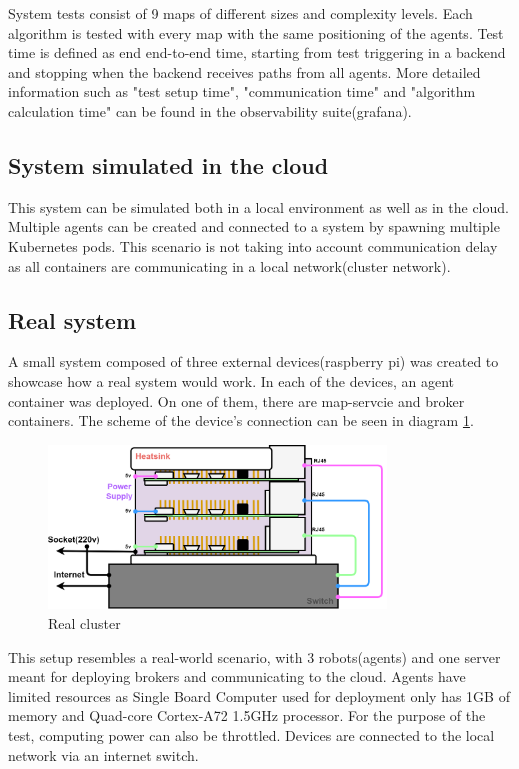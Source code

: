 System tests consist of 9 maps of different sizes and complexity levels. Each algorithm is tested with every map with the same positioning of the agents. Test time is defined as end end-to-end time, starting from test triggering in a backend and stopping when the backend receives paths from all agents. More detailed information such as "test setup time", "communication time" and "algorithm calculation time" can be found in the observability suite(grafana).

\subsection{System simulated in the cloud}
This system can be simulated both in a local environment as well as in the cloud. Multiple agents can be created and connected to a system by spawning multiple Kubernetes pods. This scenario is not taking into account communication delay as all containers are communicating in a local network(cluster network).

\subsection{Real system}
A small system composed of three external devices(raspberry pi) was created to showcase how a real system would work. In each of the devices, an agent container was deployed. On one of them, there are map-servcie and broker containers. The scheme of the device's connection can be seen in diagram \ref{fig:cluster}.
\begin{figure}[H]
    \centering
    \includegraphics[width=0.8\textwidth]{pictures/cluster.png}
    \caption{ Real cluster }
    \label{fig:cluster}
\end{figure}

This setup resembles a real-world scenario, with 3 robots(agents) and one server meant for deploying brokers and communicating to the cloud. Agents have limited resources as Single Board Computer used for deployment only has 1GB of memory and Quad-core Cortex-A72 1.5GHz processor\cite{rpi_specs}. For the purpose of the test, computing power can also be throttled. Devices are connected to the local network via an internet switch. 

